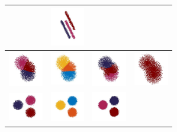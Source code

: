 \documentclass[12pt]{drexelthesis}
\begin{document}
\begin{table}[!ht]
\begin{tabular}{ | c | c | c | c | }
      &
             \includegraphics[trim={0 1cm 0 1cm},clip, width=1.5cm]{2d-cluster-tests/euclidean-distance/lines.jpg}    
      \\ \hline
      
           \includegraphics[trim={0 1cm 0 1cm},clip,width=1.5cm]{2d-cluster-tests/k-means/blob.jpg}
      & 
           \includegraphics[trim={0 0cm 0 0cm},clip,width=1.5cm]{2d-cluster-tests/fcm/blob.jpg} 
      & 
           \includegraphics[trim={0 1cm 0 1cm},clip,width=1.5cm]{2d-cluster-tests/agglomerative/blob.jpg} 


      &
           \includegraphics[trim={0 0.5cm 0 0.25cm},clip,width=1.5cm]{2d-cluster-tests/euclidean-distance/blob.jpg} 
      \\ \hline
      
            \includegraphics[width=1.5cm]{2d-cluster-tests/k-means/solid_circles.jpg}
      & 
            \includegraphics[width=1.5cm]{2d-cluster-tests/fcm/circles.jpg}
      & 
            \includegraphics[width=1.5cm]{2d-cluster-tests/agglomerative/solid_circles.jpg}



\end{tabular}
\end{table}
\end{document}
